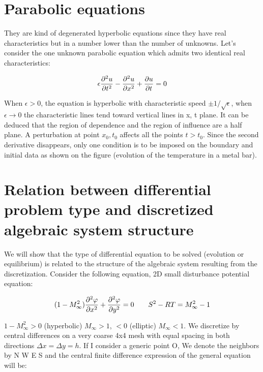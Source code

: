 \section{Parabolic equations}
They are kind of degenerated hyperbolic equations since they have real characteristics but in a number lower than the number of unknowns. Let's consider the one unknown parabolic equation which admits two identical real characteristics: 

\begin{equation}
\epsilon \frac{\partial ^2 u}{\partial t^2} - \frac{\partial ^2 u}{\partial x^2} + \frac{\partial u}{\partial t} = 0
\end{equation}

When $\epsilon >0$, the equation is hyperbolic with characteristic speed $\pm 1/\sqrt{\epsilon}$, when $\epsilon \rightarrow 0$ the characteristic lines tend toward vertical lines in x, t plane. It can be deduced that the region of dependence and the region of influence are a half plane. A perturbation at point $x_0, t_0$ affects all the points $t> t_0$. Since the second derivative disappears, only one condition is to be imposed on the boundary and initial data as shown on the figure (evolution of the temperature in a metal bar). 

\section{Relation between differential problem type and discretized algebraic system structure}

We will show that the type of differential equation to be solved (evolution or equilibrium) is related to the structure of the algebraic system resulting from the discretization. Consider the following equation, 2D small disturbance potential equation: 

\begin{equation}
(1-M^2_\infty) \frac{\partial^2 \varphi}{\partial x^2} + \frac{\partial^2\varphi}{\partial y^2} = 0 \qquad S^2 - RT = M^2_\infty -1 
\end{equation}

$1-M^2_\infty>0$ (hyperbolic) $M_\infty>1$, $<0$ (elliptic) $M_\infty<1$. We discretize by central differences on a very coarse 4x4 mesh with equal spacing in both directions $\Delta x= \Delta y = h$. If I consider a generic point O, We denote the neighbors by N W E S and the central finite difference expression of the general equation will be: 

